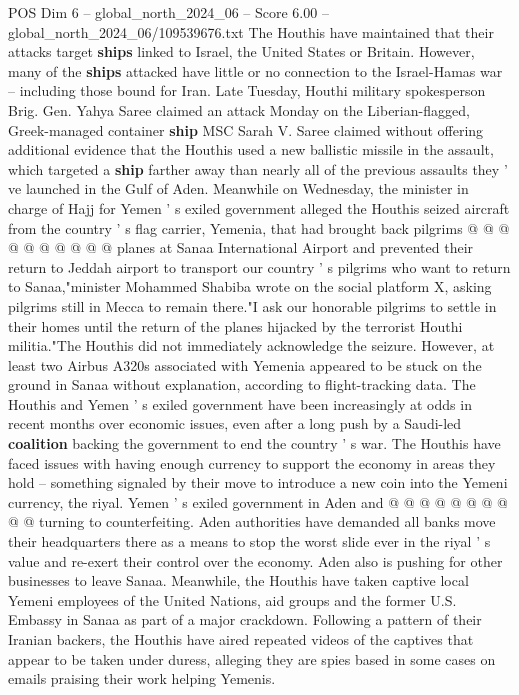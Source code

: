 \begin{textsample}{POS Dim 6 – global\_north\_2024\_06 – Score 6.00 – global\_north\_2024\_06/109539676.txt}
The Houthis have maintained that their attacks target \textbf{ships} linked to Israel, the United States or Britain.
However, many of the \textbf{ships} attacked have little or no connection to the Israel-Hamas war -- including those bound for Iran.
Late Tuesday, Houthi military spokesperson Brig.
Gen.
Yahya Saree claimed an attack Monday on the Liberian-flagged, Greek-managed container \textbf{ship} MSC Sarah V.
Saree claimed without offering additional evidence that the Houthis used a new ballistic missile in the assault, which targeted a \textbf{ship} farther away than nearly all of the previous assaults they ' ve launched in the Gulf of Aden.
Meanwhile on Wednesday, the minister in charge of Hajj for Yemen ' s exiled government alleged the Houthis seized aircraft from the country ' s flag carrier, Yemenia, that had brought back pilgrims @ @ @ @ @ @ @ @ @ @ planes at Sanaa International Airport and prevented their return to Jeddah airport to transport our country ' s pilgrims who want to return to Sanaa,"minister Mohammed Shabiba wrote on the social platform X, asking pilgrims still in Mecca to remain there."I ask our honorable pilgrims to settle in their homes until the return of the planes hijacked by the terrorist Houthi militia."The Houthis did not immediately acknowledge the seizure.
However, at least two Airbus A320s associated with Yemenia appeared to be stuck on the ground in Sanaa without explanation, according to flight-tracking data.
The Houthis and Yemen ' s exiled government have been increasingly at odds in recent months over economic issues, even after a long push by a Saudi-led \textbf{coalition} backing the government to end the country ' s war.
The Houthis have faced issues with having enough currency to support the economy in areas they hold -- something signaled by their move to introduce a new coin into the Yemeni currency, the riyal.
Yemen ' s exiled government in Aden and @ @ @ @ @ @ @ @ @ @ turning to counterfeiting.
Aden authorities have demanded all banks move their headquarters there as a means to stop the worst slide ever in the riyal ' s value and re-exert their control over the economy.
Aden also is pushing for other businesses to leave Sanaa.
Meanwhile, the Houthis have taken captive local Yemeni employees of the United Nations, aid groups and the former U.S.
Embassy in Sanaa as part of a major crackdown.
Following a pattern of their Iranian backers, the Houthis have aired repeated videos of the captives that appear to be taken under duress, alleging they are spies based in some cases on emails praising their work helping Yemenis.

\end{textsample}
